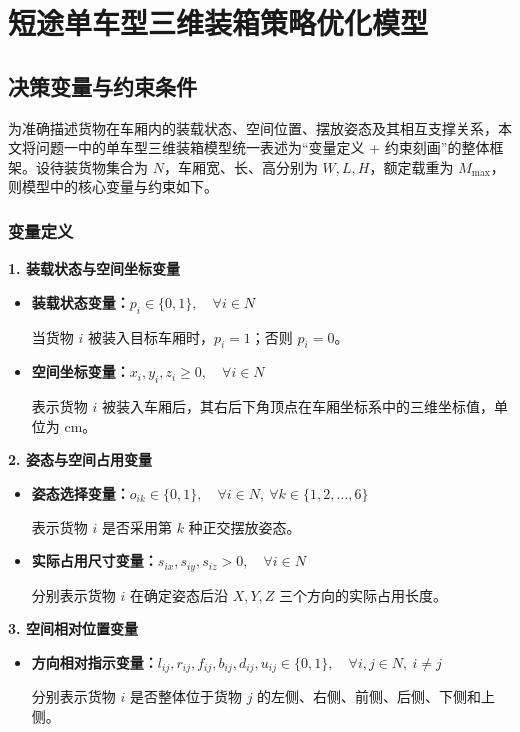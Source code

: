 \documentclass{MMCStyle}
\begin{document}
\section{短途单车型三维装箱策略优化模型}

\subsection{决策变量与约束条件}

 \hspace{2em}为准确描述货物在车厢内的装载状态、空间位置、摆放姿态及其相互支撑关系，本文将问题一中的单车型三维装箱模型统一表述为“变量定义 + 约束刻画”的整体框架。设待装货物集合为 $N$，车厢宽、长、高分别为 $W,L,H$，额定载重为 $M_{\max}$，则模型中的核心变量与约束如下。

\subsubsection{变量定义}

\noindent\textbf{1. 装载状态与空间坐标变量}

\begin{itemize}
\item \textbf{装载状态变量：}$p_i \in \{0,1\}, \quad \forall i \in N$

当货物 $i$ 被装入目标车厢时，$p_i=1$；否则 $p_i=0$。

\item \textbf{空间坐标变量：}$x_i,y_i,z_i \ge 0, \quad \forall i \in N$

表示货物 $i$ 被装入车厢后，其右后下角顶点在车厢坐标系中的三维坐标值，单位为 cm。
\end{itemize}

\noindent\textbf{2. 姿态与空间占用变量}

\begin{itemize}
\item \textbf{姿态选择变量：}$o_{ik} \in \{0,1\}, \quad \forall i \in N,\ \forall k \in \{1,2,\ldots,6\}$

表示货物 $i$ 是否采用第 $k$ 种正交摆放姿态。

\item \textbf{实际占用尺寸变量：}$s_{ix},s_{iy},s_{iz} > 0, \quad \forall i \in N$

分别表示货物 $i$ 在确定姿态后沿 $X,Y,Z$ 三个方向的实际占用长度。
\end{itemize}

\noindent\textbf{3. 空间相对位置变量}

\begin{itemize}
\item \textbf{方向相对指示变量：}$l_{ij},r_{ij},f_{ij},b_{ij},d_{ij},u_{ij} \in \{0,1\}, \quad \forall i,j \in N,\ i \neq j$

分别表示货物 $i$ 是否整体位于货物 $j$ 的左侧、右侧、前侧、后侧、下侧和上侧。
\end{itemize}
\end{document}
